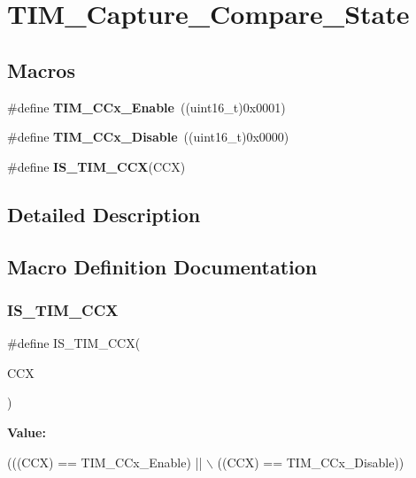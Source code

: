 \section{T\+I\+M\+\_\+\+Capture\+\_\+\+Compare\+\_\+\+State}
\label{group__TIM__Capture__Compare__State}
\subsection*{Macros}
\begin{DoxyCompactItemize}
\item 
\#define \textbf{ T\+I\+M\+\_\+\+C\+Cx\+\_\+\+Enable}~((uint16\+\_\+t)0x0001)
\item 
\#define \textbf{ T\+I\+M\+\_\+\+C\+Cx\+\_\+\+Disable}~((uint16\+\_\+t)0x0000)
\item 
\#define \textbf{ I\+S\+\_\+\+T\+I\+M\+\_\+\+C\+CX}(C\+CX)
\end{DoxyCompactItemize}


\subsection{Detailed Description}


\subsection{Macro Definition Documentation}
\mbox{\label{group__TIM__Capture__Compare__State_ga5b7461e8c9c25f6fa082118c95b02ba1}} 
\subsubsection{I\+S\+\_\+\+T\+I\+M\+\_\+\+C\+CX}
{\footnotesize\ttfamily \#define I\+S\+\_\+\+T\+I\+M\+\_\+\+C\+CX(\begin{DoxyParamCaption}\item[{}]{C\+CX }\end{DoxyParamCaption})}

{\bfseries Value\+:}
\begin{DoxyCode}
(((CCX) == TIM_CCx_Enable) || \(\backslash\)
                         ((CCX) == TIM_CCx_Disable))
\end{DoxyCode}


